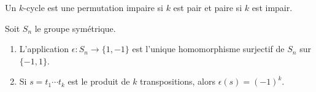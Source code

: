\begin{lemma}       \label{LemhxnkMf}
    Un \( k\)-cycle est une permutation impaire si \( k\) est pair et paire si \( k\) est impair.
\end{lemma}

\begin{proposition}  \label{ProphIuJrC}
    Soit \( S_n\) le groupe symétrique.
    \begin{enumerate}
        \item       \label{ITEMooBQKUooFTkvSu}
            L'application \( \epsilon\colon S_n\to \{ 1,-1 \}\) est l'unique homomorphisme surjectif de \( S_n\) sur \( \{ -1,1 \}\).
        \item
            Si \( s=t_1\cdots t_k\) est le produit de \( k\) transpositions, alors \( \epsilon(s)=(-1)^k\).
    \end{enumerate}
\end{proposition}

